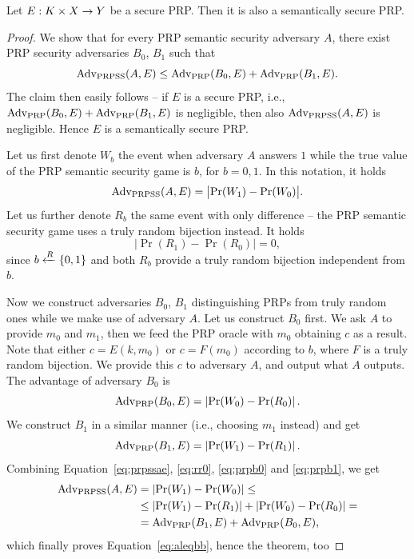 \begin{thm}
\label{thm:semsecprp}
	Let $E: K\times X\rightarrow Y$ be a secure PRP. Then it is also a semantically secure PRP.
\end{thm}
\begin{proof}
	We show that for every PRP semantic security adversary $A$, there exist PRP security adversaries $B_0$, $B_1$ such that
	\begin{equation}
	\label{eq:aleqbb}
		\operatorname*{Adv_{PRPSS}}(A,E) \leq \operatorname*{Adv_{PRP}}(B_0,E) + \operatorname*{Adv_{PRP}}(B_1,E) .
	\end{equation}
	The claim then easily follows -- if $E$ is a secure PRP, i.e., $\operatorname*{Adv_{PRP}}(B_0,E) + \operatorname*{Adv_{PRP}}(B_1,E)$ is negligible, then also $\operatorname*{Adv_{PRPSS}}(A,E)$ is negligible. Hence $E$ is a semantically secure PRP.
	
	Let us first denote $W_b$ the event when adversary $A$ answers $1$ while the true value of the PRP semantic security game is $b$, for $b=0,1$. In this notation, it holds
	\begin{equation}
	\label{eq:prpssae}
		\operatorname*{Adv_{PRPSS}}(A,E) = \bigl| \Pr(W_1) - \Pr(W_0) \bigr| .
	\end{equation}
	Let us further denote $R_b$ the same event with only difference -- the PRP semantic security game uses a truly random bijection instead. It holds
	\begin{equation}
	\label{eq:rr0}
		\bigl| \Pr(R_1) - \Pr(R_0) \bigr| = 0 ,
	\end{equation}
	since $b\xleftarrow{R}\{0,1\}$ and both $R_b$ provide a truly random bijection independent from $b$.
	
	Now we construct adversaries $B_0$, $B_1$ distinguishing PRPs from truly random ones while we make use of adversary $A$. Let us construct $B_0$ first. We ask $A$ to provide $m_0$ and $m_1$, then we feed the PRP oracle with $m_0$ obtaining $c$ as a result. Note that either $c=E(k,m_0)$ or $c=F(m_0)$ according to $b$, where $F$ is a truly random bijection. We provide this $c$ to adversary $A$, and output what $A$ outputs. The advantage of adversary $B_0$ is
	\begin{equation}
	\label{eq:prpb0}
		\operatorname*{Adv_{PRP}}(B_0,E) = \left| \Pr(W_0) - \Pr(R_0) \right| .
	\end{equation}
	We construct $B_1$ in a similar manner (i.e., choosing $m_1$ instead) and get
	\begin{equation}
	\label{eq:prpb1}
		\operatorname*{Adv_{PRP}}(B_1,E) = \left| \Pr(W_1) - \Pr(R_1) \right| .
	\end{equation}
	Combining Equation~\ref{eq:prpssae}, \ref{eq:rr0}, \ref{eq:prpb0} and \ref{eq:prpb1}, we get
	\begin{align*}
		\operatorname*{Adv_{PRPSS}}(A,E) &= \left| \Pr(W_1) - \Pr(W_0) \right| \leq \\
		&\leq \left| \Pr(W_1) - \Pr(R_1) \right| + \left| \Pr(W_0) - \Pr(R_0) \right| = \\
		&= \operatorname*{Adv_{PRP}}(B_1,E) + \operatorname*{Adv_{PRP}}(B_0,E) ,
	\end{align*}
	which finally proves Equation~\ref{eq:aleqbb}, hence the theorem, too
\end{proof}

